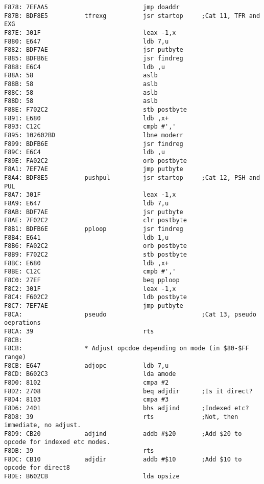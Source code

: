 {\begin{verbatim}
F878: 7EFAA5                          jmp doaddr
F87B: BDF8E5          tfrexg          jsr startop     ;Cat 11, TFR and EXG
F87E: 301F                            leax -1,x
F880: E647                            ldb 7,u
F882: BDF7AE                          jsr putbyte
F885: BDFB6E                          jsr findreg
F888: E6C4                            ldb ,u
F88A: 58                              aslb 
F88B: 58                              aslb
F88C: 58                              aslb
F88D: 58                              aslb
F88E: F702C2                          stb postbyte
F891: E680                            ldb ,x+
F893: C12C                            cmpb #','
F895: 102602BD                        lbne moderr
F899: BDFB6E                          jsr findreg
F89C: E6C4                            ldb ,u
F89E: FA02C2                          orb postbyte
F8A1: 7EF7AE                          jmp putbyte             
F8A4: BDF8E5          pushpul         jsr startop     ;Cat 12, PSH and PUL
F8A7: 301F                            leax -1,x
F8A9: E647                            ldb 7,u
F8AB: BDF7AE                          jsr putbyte
F8AE: 7F02C2                          clr postbyte
F8B1: BDFB6E          pploop          jsr findreg
F8B4: E641                            ldb 1,u
F8B6: FA02C2                          orb postbyte
F8B9: F702C2                          stb postbyte
F8BC: E680                            ldb ,x+
F8BE: C12C                            cmpb #','
F8C0: 27EF                            beq pploop
F8C2: 301F                            leax -1,x
F8C4: F602C2                          ldb postbyte
F8C7: 7EF7AE                          jmp putbyte             
F8CA:                 pseudo                          ;Cat 13, pseudo oeprations
F8CA: 39                              rts
F8CB:                 
F8CB:                 * Adjust opcdoe depending on mode (in $80-$FF range)
F8CB: E647            adjopc          ldb 7,u
F8CD: B602C3                          lda amode
F8D0: 8102                            cmpa #2
F8D2: 2708                            beq adjdir      ;Is it direct?
F8D4: 8103                            cmpa #3
F8D6: 2401                            bhs adjind      ;Indexed etc?
F8D8: 39                              rts             ;Not, then immediate, no adjust.
F8D9: CB20            adjind          addb #$20       ;Add $20 to opcode for indexed etc modes.
F8DB: 39                              rts
F8DC: CB10            adjdir          addb #$10       ;Add $10 to opcode for direct8
F8DE: B602CB                          lda opsize

\end{verbatim}}

